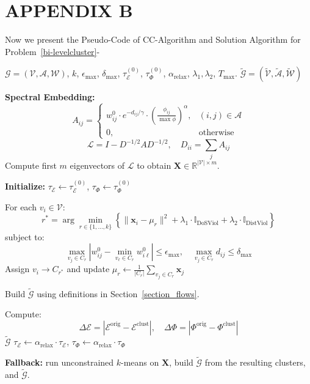 \documentclass[lettersize,journal]{IEEEtran}
\begin{document}
\section*{APPENDIX B}
Now we present the Pseudo-Code of CC-Algorithm and Solution Algorithm for Problem~\ref{bi-levelcluster}- 
\begin{algorithm}[t]
\caption{Constrained Spectral Clustering for Bike Networks (CC-Algorithm)}
\label{alg:constrained-clustering-math}
\begin{algorithmic}[1]
\Require$\mathcal{G} = (\mathcal{V}, \mathcal{A}, \mathcal{W})$, 
  $k$,
  $\epsilon_{\max}$, 
  $\delta_{\max}$, 
  $\tau_{\mathcal{E}}^{(0)}$, $\tau_{\Phi}^{(0)}$, 
  $\alpha_{\text{relax}}$, 
  $\lambda_1,\lambda_2$, 
  $T_{\max}$.
\Ensure $\tilde{\mathcal{G}} = (\tilde{\mathcal{V}}, \tilde{\mathcal{A}}, \tilde{\mathcal{W}})$

\State \textbf{Spectral Embedding:}
\[
A_{ij} =
\begin{cases}
w_{ij}^{0} \cdot e^{-d_{ij}/\gamma} \cdot \left(\frac{\phi_{ij}}{\max \phi}\right)^\alpha, & (i,j) \in \mathcal{A} \\
0, & \text{otherwise}
\end{cases}
\]
\[
\mathcal{L} = I - D^{-1/2} A D^{-1/2}, \quad D_{ii} = \sum_j A_{ij}
\]
Compute first $m$ eigenvectors of $\mathcal{L}$ to obtain $\mathbf{X} \in \mathbb{R}^{|\mathcal{V}| \times m}$.

\State \textbf{Initialize:} $\tau_{\mathcal{E}} \gets \tau_{\mathcal{E}}^{(0)}$, \quad $\tau_{\Phi} \gets \tau_{\Phi}^{(0)}$

    \State For each $v_i \in \mathcal{V}$:
    \[
    r^* = \arg\min_{r \in \{1, \dots, k\}} \left\{ \|\mathbf{x}_i - \mu_r\|^2 + \lambda_1 \cdot \mathbb{I}_{\text{DoSViol}} + \lambda_2 \cdot \mathbb{I}_{\text{DistViol}} \right\}
    \]
    subject to:
    \[
    \max_{v_j \in C_r} \left| w_{ij}^{0} - \min_{v_\ell \in C_r} w_{i\ell}^{0} \right| \leq \epsilon_{\max}, \quad
    \max_{v_j \in C_r} d_{ij} \leq \delta_{\max}
    \]
    Assign $v_i \to C_{r^*}$ and update $\mu_r \gets \frac{1}{|C_r|} \sum_{v_j \in C_r} \mathbf{x}_j$

    \State Build $\tilde{\mathcal{G}}$ using definitions in Section~\ref{section_flows}.

    \State Compute:
    \[
    \Delta\mathcal{E} = \left| \mathcal{E}^{\text{orig}} - \mathcal{E}^{\text{clust}} \right|, \quad
    \Delta\Phi = \left| \Phi^{\text{orig}} - \Phi^{\text{clust}} \right|
    \]
        \State \Return $\tilde{\mathcal{G}}$
    \Else
        \State $\tau_{\mathcal{E}} \gets \alpha_{\text{relax}} \cdot \tau_{\mathcal{E}}$, \quad
              $\tau_{\Phi} \gets \alpha_{\text{relax}} \cdot \tau_{\Phi}$
    \EndIf
\EndFor

\State \textbf{Fallback:} run unconstrained $k$-means on $\mathbf{X}$, build $\tilde{\mathcal{G}}$ from the resulting clusters, and \Return $\tilde{\mathcal{G}}$.
\end{algorithmic}
\end{algorithm}
\end{document}
